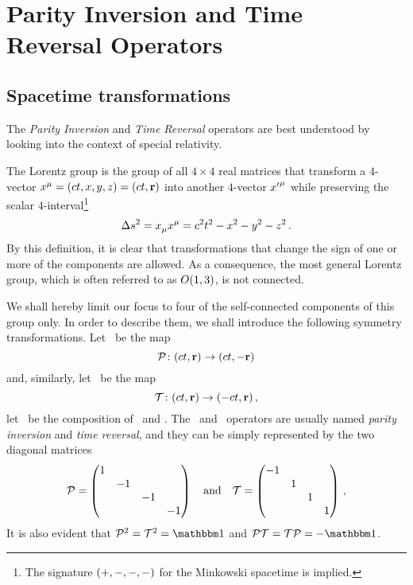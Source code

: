 \chapter{Parity Inversion and Time Reversal Operators}\label{ch:pt-operators}
    \section{Spacetime transformations}
        The \emph{Parity Inversion} and \emph{Time Reversal} operators are best understood by looking into the context of special relativity.

        The Lorentz group is the group of all $4\times4$ real matrices that transform a $4$-vector $\tensor{x}{^\mu} = \pqty{ct,x,y,z} = \pqty{ct,\vb{r}}$ into another $4$-vector $\tensor{{x'}}{^\mu}$ while preserving the scalar $4$-interval\footnote{The signature $\pqty{+,-,-,-}$ for the Minkowski spacetime is implied.}
        \begin{equation}
            \label{eq:4-interval}
            \Delta s^2
            = \tensor{x}{_\mu} \tensor{x}{^\mu}
            = c^2t^2 - x^2 - y^2 - z^2
            \myperiod
        \end{equation}
        By this definition, it is clear that transformations that change the sign of one or more of the components are allowed. As a consequence, the most general Lorentz group, which is often referred to as $O\pqty{1,3}$, is not connected.

        We shall hereby limit our focus to four of the self-connected components of this group only. In order to describe them, we shall introduce the following symmetry transformations. Let \mcP\ be the map 
        \begin{equation}
            \label{eq:lorentz-P}
            \func{\mcP}{\pqty{ct,\vb{r}}}{\pqty{ct,-\vb{r}}}
        \end{equation}
        and, similarly, let \mcT\ be the map
        \begin{equation}
            \label{eq:lorentz-T}
            \func{\mcT}{\pqty{ct,\vb{r}}}{\pqty{-ct,\vb{r}}}
            \mycomma
        \end{equation}
        let \PT\ be the composition of \mcP\ and \mcT.
        The \mcP\ and \mcT\ operators are usually named \emph{parity inversion} and \emph{time reversal}, and they can be simply represented by the two diagonal matrices
        \begin{equation*}
            \mcP = \pmqty{\dmat{1,-1,-1,-1}}
            \qand
            \mcT = \pmqty{\dmat{-1,1,1,1}}
            \mycomma
        \end{equation*}
        It is also evident that $\mcP^2 = \mcT^2 = \idM$ and $\PT = \mcT\mcP = -\idM$.
        
